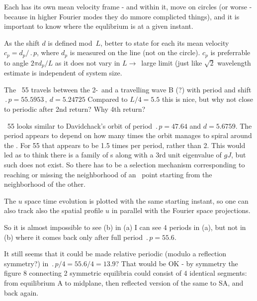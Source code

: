 
Each {\rpo} has its own mean velocity frame - and within it, {\eqv}
move on circles (or worse - because in higher Fourier modes they do mmore
complicted things), and it is important to know where the equlibrium is at
a given instant.

As the shift $d$ is defined mod~$L$, better to
state for each {\rpo} its mean velocity $c_p = d_p/\period{p}$,
where $d_p$ is measured on the line (not on the circle). $c_p$ is
preferrable to angle $2\pi d_p/L$ as it does not vary in $L \to$~large 
limit (just like $\sqrt{2}$ wavelength estimate is independent of
system size.

The \rpo\ {\nameit}55 travels between the 2-\eqv\  and a
travelling wave B (?) 
with period and shift
$\period{p}=55.5953\,,\ d=5.24725$
Compared to $L/4 = 5.5$
this is nice, but why not close to periodic after 2nd return? Why 4th return?

\Rpo\ {\nameit}55 looks similar to Davidchack's  orbit
of period 
$\period{p}=47.64$ and $d=5.6759$. The period appears to depend on how
many times the orbit manages to spiral around the \eqv.
For {\nameit}55 that appears to be
1.5 times per period, rather than 2. This would led as
to
think there is a family of \rpo s along with a 3rd unit eigenvalue of
$gJ$,
but such does not exist.
So there has to be a selection mechanism corresponding to
reaching or missing the neighborhood of an \eqv\  point starting from
the neighborhood of the other. 

The $u$ space time evolution  %
is plotted with the same starting instant,
so one can also track also the spatial profile $u$ in parallel with
the Fourier space projections.

So it is almost impossible to see (b) %
in (a) %
I can see 4 periods in (a), %
but not in (b) %
where it comes back only after full period $\period{p}=55.6$.

It still seems that it could be made relative periodic 
(modulo a reflection symmetry?)
in $\period{p}/4=55.6/4=13.9$? That would be OK 
-
by symmetry the figure 8 connecting
2 symmetric equilibria could consist of 4 identical segments: from
equilibrium A to midplane, then reflected version of the same to SA, and
back again.

